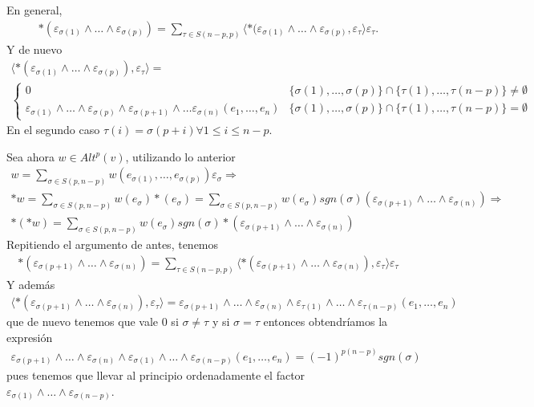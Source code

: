 \documentclass[twoside]{article}
\begin{document}
\begin{solucion}
En general, 
\begin{gather*}
*(\varepsilon_{\sigma(1)}\land\dots\land\varepsilon_{\sigma(p)})=\sum_{\tau\in S(n-p,p)}\langle *(\varepsilon_{\sigma(1)}\land\dots\land\varepsilon_{\sigma(p)},\varepsilon_{\tau}\rangle\varepsilon_{\tau}.
\end{gather*}
Y de nuevo
\begin{gather*}
\langle *(\varepsilon_{\sigma(1)}\land\dots\land\varepsilon_{\sigma(p)}),\varepsilon_{\tau}\rangle=\\
\begin{cases}
0 & \{\sigma(1),\dots, \sigma(p)\}\cap\{\tau(1),\dots,\tau(n-p)\}\neq\emptyset\\
\varepsilon_{\sigma(1)}\land\dots\land\varepsilon_{\sigma(p)}\land\varepsilon_{\sigma(p+1)}\land\dots\varepsilon_{\sigma(n)}(e_1,\dots, e_n) & \{\sigma(1),\dots, \sigma(p)\}\cap\{\tau(1),\dots,\tau(n-p)\}=\emptyset
\end{cases}
\end{gather*}
En el segundo caso $\tau(i)=\sigma(p+i)\forall 1\leq i\leq n-p$.

Sea ahora $w\in Alt^p(v)$, utilizando lo anterior
\begin{gather*}
w=\sum_{\sigma\in S(p,n-p)}w(e_{\sigma(1)},\dots, e_{\sigma(p)})\varepsilon_{\sigma}\Rightarrow\\
*w=\sum_{\sigma\in S(p,n-p)}w(e_{\sigma})*(e_{\sigma})=\sum_{\sigma\in S(p,n-p)}w(e_{\sigma})sgn(\sigma)(\varepsilon_{\sigma(p+1)}\land\dots\land\varepsilon_{\sigma(n)})\Rightarrow\\
*(*w)=\sum_{\sigma\in S(p,n-p)}w(e_{\sigma})sgn(\sigma)*(\varepsilon_{\sigma(p+1)}\land\dots\land\varepsilon_{\sigma(n)})
\end{gather*}
Repitiendo el argumento de antes, tenemos
\begin{gather*}
*(\varepsilon_{\sigma(p+1)}\land\dots\land\varepsilon_{\sigma(n)})=\sum_{\tau\in S(n-p,p)}\langle *(\varepsilon_{\sigma(p+1)}\land\dots\land\varepsilon_{\sigma(n)}),\varepsilon_{\tau}\rangle\varepsilon_{\tau}
\end{gather*}
Y además
\begin{gather*}
\langle *(\varepsilon_{\sigma(p+1)}\land\dots\land\varepsilon_{\sigma(n)}),\varepsilon_{\tau}\rangle=\varepsilon_{\sigma(p+1)}\land\dots\land\varepsilon_{\sigma(n)}\land\varepsilon_{\tau(1)}\land\dots\land\varepsilon_{\tau(n-p)}(e_1,\dots, e_n)
\end{gather*}
que de nuevo tenemos que vale 0 si $\sigma\neq\tau$ y si $\sigma=\tau$ entonces obtendríamos la expresión
\begin{gather*}
\varepsilon_{\sigma(p+1)}\land\dots\land\varepsilon_{\sigma(n)}\land\varepsilon_{\sigma(1)}\land\dots\land\varepsilon_{\sigma(n-p)}(e_1,\dots, e_n)=(-1)^{p(n-p)}sgn(\sigma)
\end{gather*}
pues tenemos que llevar al principio ordenadamente el factor $\varepsilon_{\sigma(1)}\land\dots\land\varepsilon_{\sigma(n-p)}$.


\end{solucion}
\end{document}
